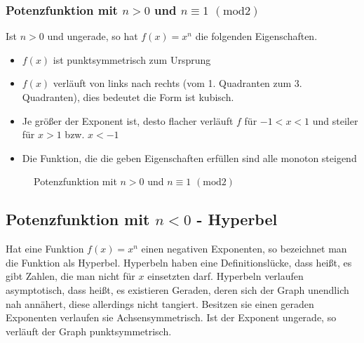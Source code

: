 \subsubsection{Potenzfunktion mit $n>0$ und $ n\equiv1$ $(\mathrm{mod}2)$}
Ist $n>0$ und ungerade, so hat $f(x)=x^n$ die folgenden Eigenschaften.
\begin{itemize}
	\item $f(x)$ ist punktsymmetrisch zum Ursprung
	\item $f(x)$ verläuft von links nach rechts (vom 1. Quadranten zum 3. Quadranten), dies bedeutet die Form ist kubisch. %
	\item Je größer der Exponent ist, desto flacher verläuft $f$ für $-1<x<1$ und steiler für $x>1$ bzw. $x<-1$
	\item Die Funktion, die die geben Eigenschaften erfüllen sind alle monoton steigend
\end{itemize}
\begin{figure}[h!]
\centering
{}
\caption{Potenzfunktion mit $n>0$ und $ n\equiv1$ $(\mathrm{mod}2)$}
\end{figure}
\subsection{Potenzfunktion mit $n<0$ - Hyperbel}\label{sec:Potenzfunktionen/Potenzfunktionen mit negativem Exponenten}
Hat eine Funktion $f(x)=x^n$ einen negativen Exponenten, so bezeichnet man die Funktion als Hyperbel. Hyperbeln haben eine Definitionslücke, dass heißt, es gibt Zahlen, die man nicht für $x$ einsetzten darf. Hyperbeln verlaufen asymptotisch, dass heißt, es existieren Geraden, deren sich der Graph unendlich nah annähert, diese allerdings nicht tangiert. Besitzen sie einen geraden Exponenten verlaufen sie Achsensymmetrisch. Ist der Exponent ungerade, so verläuft der Graph punktsymmetrisch. 
